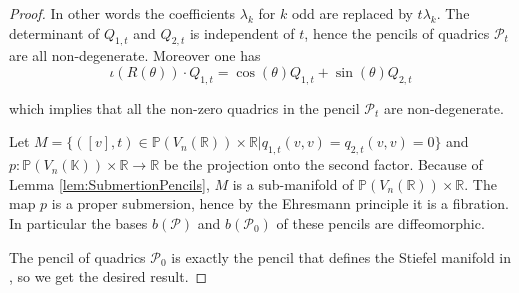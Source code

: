\documentclass[reqno,10pt]{amsart}
\theoremstyle{plain}
\theoremstyle{definition}
\theoremstyle{remark}
\newcommand{\R}{\mathbb{R}}
\newcommand{\K}{\mathbb{K}}
\begin{document}
\begin{proof}
In other words the coefficients $\lambda_k$ for $k$ odd are replaced by $t\lambda_k$.
The determinant of $Q_{1,t}$ and $Q_{2,t}$ is independent of $t$, hence the pencils of quadrics $\mathcal{P}_t$ are all non-degenerate. Moreover one has 
$$\iota\left(R\left(\theta\right)\right)\cdot Q_{1,t}=\cos(\theta)Q_{1,t}+\sin(\theta)Q_{2,t}$$

which implies that all the non-zero quadrics in the pencil $\mathcal{P}_t$ are non-degenerate. 

\medskip

Let $M=\lbrace([v],t)\in \mathbb{P}(V_n(\R))\times \R|q_{1,t}(v,v)=q_{2,t}(v,v)=0\rbrace$ and $p:\mathbb{P}(V_n(\K))\times \R \to \R$ be the projection onto the second factor. Because of Lemma \ref{lem:SubmertionPencils}, $M$ is a sub-manifold of  $\mathbb{P}(V_n(\R))\times \R$. The map $p$ is a proper submersion, hence by the Ehresmann principle it is a fibration. In particular the bases $b(\mathcal{P})$ and $b(\mathcal{P}_0)$ of these pencils are diffeomorphic.

\bigskip

The pencil of quadrics $\mathcal{P}_0$ is exactly the pencil that defines the Stiefel manifold in \cite{ADL}, so we get the desired result.
 
\end{proof}



\newpage


\end{document}

